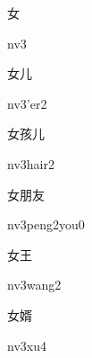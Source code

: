 \begin{multicols*}{2}
\begin{verbete}[nv3]{女}
\begin{pronuncia}{nv3}
\end{pronuncia}
\end{verbete}

\begin{verbete}[nv3'er2]{女儿}
\begin{pronuncia}{nv3'er2}
\end{pronuncia}
\end{verbete}

\begin{verbete}[nv3hair2]{女孩儿}
\begin{pronuncia}{nv3hair2}
\end{pronuncia}
\end{verbete}

\begin{verbete}{女朋友}
\begin{pronuncia}{nv3peng2you0}
\end{pronuncia}
\end{verbete}

\begin{verbete}[nv3wang2]{女王}
\begin{pronuncia}{nv3wang2}
\end{pronuncia}
\end{verbete}

\begin{verbete}[nv3xu4]{女婿}
\begin{pronuncia}{nv3xu4}
\end{pronuncia}
\end{verbete}

\end{multicols*}
